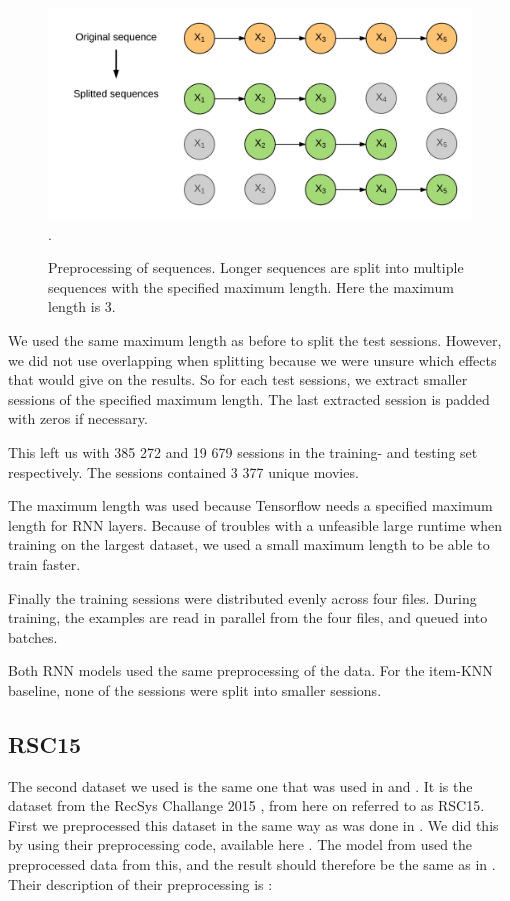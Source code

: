 \begin{figure}[htp]
	\centering
	\includegraphics[width=1.0\textwidth]{fig/data-sequence-split.png}.
	\caption{Preprocessing of sequences. Longer sequences are split into multiple sequences with the specified maximum length. Here the maximum length is 3.}
	\label{fig:data-sequence-split}
\end{figure}

We used the same maximum length as before to split the test sessions. However, we did not use overlapping when splitting because we were unsure which effects that would give on the results. So for each test sessions, we extract smaller sessions of the specified maximum length. The last extracted session is padded with zeros if necessary.

This left us with 385 272 and 19 679 sessions in the training- and testing set respectively. The sessions contained 3 377 unique movies.

The maximum length was used because Tensorflow needs a specified maximum length for RNN layers. Because of troubles with a unfeasible large runtime when training on the largest dataset, we used a small maximum length to be able to train faster. 

Finally the training sessions were distributed evenly across four files. During training, the examples are read in parallel from the four files, and queued into batches. 

Both RNN models used the same preprocessing of the data. For the item-KNN baseline, none of the sessions were split into smaller sessions.

\subsection{RSC15}
The second dataset we used is the same one that was used in \cite{DBLP:journals/corr/HidasiKBT15} and \cite{DBLP:journals/corr/TanXL16}. It is the dataset from the RecSys Challange 2015 \cite{dataset:recsys15}, from here on referred to as RSC15. First we preprocessed this dataset in the same way as was done in \cite{DBLP:journals/corr/HidasiKBT15}. We did this by using their preprocessing code, available here \cite{hidasi:code}. The model from \cite{DBLP:journals/corr/HidasiKBT15} used the preprocessed data from this, and the result should therefore be the same as in \cite{DBLP:journals/corr/HidasiKBT15}. Their description of their preprocessing is \cite{DBLP:journals/corr/HidasiKBT15}:

